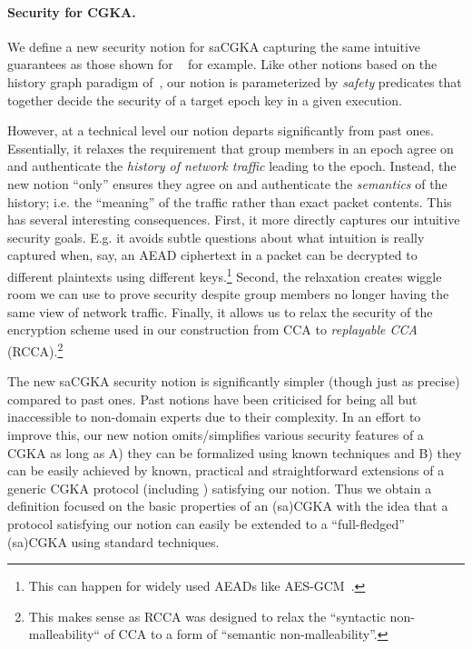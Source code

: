 \paragraph{Security for CGKA.}
We define a new security notion for saCGKA capturing the same intuitive
guarantees as those shown for \protITK~\cite{EPRINT:AlwJosMul20} for example.
Like other notions based on the history graph paradigm of~\cite{CCS:ACDT21},
our notion is parameterized by \emph{safety} predicates that together decide
the security of a target epoch key in a given execution.

However, at a technical level our notion departs significantly from past
ones. Essentially, it relaxes the requirement that group members in an epoch
agree on and authenticate the \emph{history of network traffic} leading to
the epoch. Instead, the new notion ``only'' ensures they agree on and
authenticate the \emph{semantics} of the history; i.e. the ``meaning'' of the
traffic rather than exact packet contents. This has several interesting
consequences. First, it more directly captures our intuitive security goals.
E.g. it avoids subtle questions about what intuition is really captured when,
say, an AEAD ciphertext in a packet can be decrypted to different plaintexts
using different keys.\footnote{This can happen for widely used AEADs like
AES-GCM~\cite{C:DGRW18}.} Second, the relaxation creates wiggle
room we can use to prove security despite group members no longer having the
same view of network traffic. Finally, it allows us to relax the security of
the encryption scheme used in our construction from CCA to
\emph{replayable CCA} (RCCA)\cite{C:CanKraNie03}.\footnote{This makes sense
as RCCA was designed to relax the ``syntactic non-malleability`` of CCA to a
form of ``semantic non-malleability''.}

The new saCGKA security notion is significantly simpler (though just as
precise) compared to past ones. Past notions have been criticised for being
all but inaccessible to non-domain experts due to their complexity. In an
effort to improve this, our new notion omits/simplifies various security
features of a CGKA as long as A) they can be formalized using known
techniques and B) they can be easily achieved by known, practical and
straightforward extensions of a generic CGKA protocol (including \saik)
satisfying our notion. Thus we obtain a definition focused on the basic
properties of an (sa)CGKA with the idea that a protocol satisfying our notion
can easily be extended to a ``full-fledged'' (sa)CGKA using standard
techniques.


